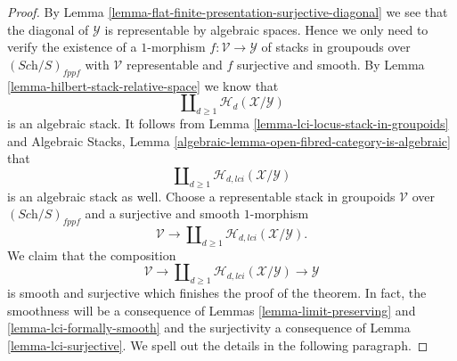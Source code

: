 \begin{proof}
By
Lemma \ref{lemma-flat-finite-presentation-surjective-diagonal}
we see that the diagonal of $\mathcal{Y}$ is representable by algebraic
spaces. Hence we only need to verify the existence of a $1$-morphism
$f : \mathcal{V} \to \mathcal{Y}$ of stacks in groupouds over
$(\textit{Sch}/S)_{fppf}$ with $\mathcal{V}$ representable and
$f$ surjective and smooth. By
Lemma \ref{lemma-hilbert-stack-relative-space}
we know that
$$
\coprod\nolimits_{d \geq 1} \mathcal{H}_d(\mathcal{X}/\mathcal{Y})
$$
is an algebraic stack. It follows from
Lemma \ref{lemma-lci-locus-stack-in-groupoids}
and
Algebraic Stacks,
Lemma \ref{algebraic-lemma-open-fibred-category-is-algebraic}
that
$$
\coprod\nolimits_{d \geq 1} \mathcal{H}_{d, lci}(\mathcal{X}/\mathcal{Y})
$$
is an algebraic stack as well. Choose a representable stack in groupoids
$\mathcal{V}$ over $(\textit{Sch}/S)_{fppf}$ and a surjective and smooth
$1$-morphism
$$
\mathcal{V}
\longrightarrow
\coprod\nolimits_{d \geq 1} \mathcal{H}_{d, lci}(\mathcal{X}/\mathcal{Y}).
$$
We claim that the composition
$$
\mathcal{V}
\longrightarrow
\coprod\nolimits_{d \geq 1} \mathcal{H}_{d, lci}(\mathcal{X}/\mathcal{Y})
\longrightarrow
\mathcal{Y}
$$
is smooth and surjective which finishes the proof of the theorem. In fact,
the smoothness will be a consequence of
Lemmas \ref{lemma-limit-preserving} and \ref{lemma-lci-formally-smooth}
and the surjectivity a consequence of
Lemma \ref{lemma-lci-surjective}.
We spell out the details in the following paragraph.


\end{proof}
